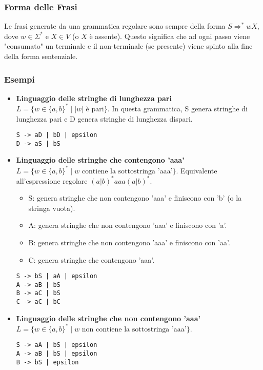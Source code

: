 \subsubsection{Forma delle Frasi}
Le frasi generate da una grammatica regolare sono sempre della forma $S \Rightarrow^* wX$, dove $w \in \Sigma^*$ e $X \in V$ (o $X$ è assente). Questo significa che ad ogni passo viene "consumato" un terminale e il non-terminale (se presente) viene spinto alla fine della forma sentenziale.


\subsubsection{Esempi}

\begin{itemize}

    \item \textbf{Linguaggio delle stringhe di lunghezza pari} \\
    $L = \{w \in \{a,b\}^* \mid |w| \text{ è pari}\}$.
    In questa grammatica, S genera stringhe di lunghezza pari e D genera stringhe di lunghezza dispari.
    \begin{Verbatim}[frame=single]
S -> aD | bD | epsilon
D -> aS | bS
    \end{Verbatim}

    \item \textbf{Linguaggio delle stringhe che contengono 'aaa'} \\
    $L = \{w \in \{a,b\}^* \mid w \text{ contiene la sottostringa 'aaa'}\}$.
    Equivalente all'espressione regolare $(a|b)^*aaa(a|b)^*$.
    \begin{itemize}
        \item S: genera stringhe che non contengono 'aaa' e finiscono con 'b' (o la stringa vuota).
        \item A: genera stringhe che non contengono 'aaa' e finiscono con 'a'.
        \item B: genera stringhe che non contengono 'aaa' e finiscono con 'aa'.
        \item C: genera stringhe che contengono 'aaa'.
    \end{itemize}
    \begin{Verbatim}[frame=single]
S -> bS | aA | epsilon
A -> aB | bS
B -> aC | bS
C -> aC | bC
    \end{Verbatim}

    \item \textbf{Linguaggio delle stringhe che non contengono 'aaa'} \\
    $L = \{w \in \{a,b\}^* \mid w \text{ non contiene la sottostringa 'aaa'}\}$.
    \begin{Verbatim}[frame=single]
S -> aA | bS | epsilon
A -> aB | bS | epsilon
B -> bS | epsilon
    \end{Verbatim}


\end{itemize}
